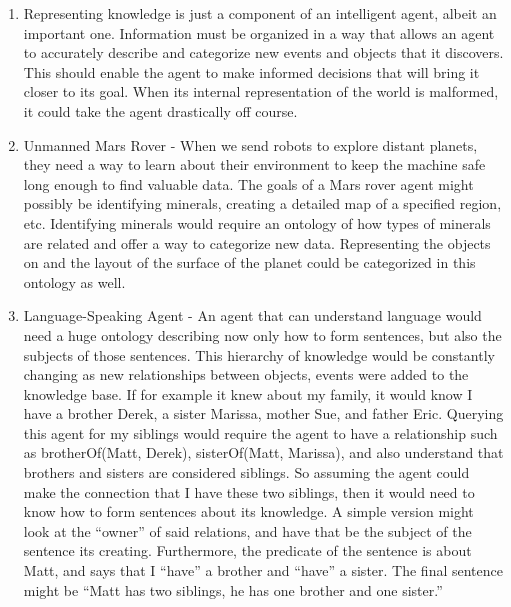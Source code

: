 \documentclass[a4paper,12pt]{article}
\begin{document}
\begin{enumerate}[]
  
\item Representing knowledge is just a component of an intelligent
  agent, albeit an important one. Information must be organized in a
  way that allows an agent to accurately describe and categorize new
  events and objects that it discovers. This should enable the agent
  to make informed decisions that will bring it closer to its
  goal. When its internal representation of the world is malformed, it
  could take the agent drastically off course.
  
\item Unmanned Mars Rover - When we send robots to explore distant
  planets, they need a way to learn about their environment to keep
  the machine safe long enough to find valuable data. The goals of a
  Mars rover agent might possibly be identifying minerals, creating a
  detailed map of a specified region, etc. Identifying minerals would
  require an ontology of how types of minerals are related and offer a
  way to categorize new data. Representing the objects on and the
  layout of the surface of the planet could be categorized in this
  ontology as well.

\item Language-Speaking Agent - An agent that can understand language
  would need a huge ontology describing now only how to form
  sentences, but also the subjects of those sentences. This hierarchy
  of knowledge would be constantly changing as new relationships
  between objects, events were added to the knowledge base. If for
  example it knew about my family, it would know I have a brother
  Derek, a sister Marissa, mother Sue, and father Eric. Querying this
  agent for my siblings would require the agent to have a relationship
  such as brotherOf(Matt, Derek), sisterOf(Matt, Marissa), and also
  understand that brothers and sisters are considered siblings. So
  assuming the agent could make the connection that I have these two
  siblings, then it would need to know how to form sentences about its
  knowledge. A simple version might look at the ``owner'' of said
  relations, and have that be the subject of the sentence its
  creating. Furthermore, the predicate of the sentence is about Matt,
  and says that I ``have'' a brother and ``have'' a sister. The final
  sentence might be ``Matt has two siblings, he has one brother and
  one sister.'' 
  
\end{enumerate}
\end{document}
